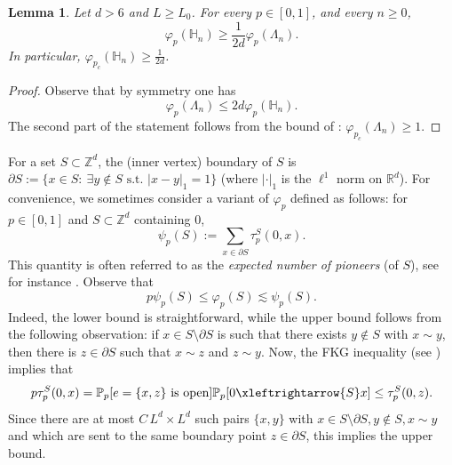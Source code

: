 \documentclass[11pt,a4paper]{article}
\numberwithin{equation}{section}
\theoremstyle{plain}
\newtheorem{Lem}[Thm]{Lemma}
\theoremstyle{definition}
\newcommand{\connect}{\xleftrightarrow}
\newcommand{\1}{\mathbf 1}
\def \p {{\partial}}
\begin{document}
\begin{Lem}\label{lem:lower bound phi} Let $d>6$ and $L\geq L_0$. For every $p\in [0,1]$, and every $n\geq 0$,
\begin{equation}
	\varphi_{p}(\mathbb H_n)\geq \frac{1}{2d}\varphi_{p}(\Lambda_n).
\end{equation}
In particular, $\varphi_{p_c}(\mathbb H_n)\geq \tfrac{1}{2d}$.
\end{Lem}
\begin{proof} Observe that by symmetry one has
\begin{equation}
	\varphi_{p}(\Lambda_n)\leq 2d \varphi_{p}(\mathbb H_n).
\end{equation}
The second part of the statement follows from the bound of \cite{DuminilTassionNewProofSharpness2016}: $\varphi_{p_c}(\Lambda_n)\geq 1$.
\end{proof}
For a set $S\subset \mathbb Z^d$, the (inner vertex) boundary of $S$ is $\partial S:=\{x\in S:~\exists y\notin S \text{ s.t. } \vert x-y\vert_1=1\}$ (where $|\cdot|_1$ is the $\ell^1$ norm on $\mathbb R^d$).
For convenience, we sometimes consider a variant of $\varphi_{p}$ defined as follows: for $p\in [0,1]$ and $S\subset \mathbb Z^d$ containing $0$,
	\begin{equation}
		\psi_{p}(S):=\sum_{x\in \partial S} \tau_{p}^{S}(0,x).
	\end{equation}
This quantity is often referred to as the \emph{expected number of pioneers} (of $S$), see for instance \cite{HutchcroftMichtaSladePercolationTorusPlateau2023}. Observe that
\begin{equation}\label{eq:comparison psi phi}
	p\psi_{p}(S)\leq \varphi_{p}(S) \lesssim \psi_{p}(S).
\end{equation}
Indeed, the lower bound is straightforward, while the upper bound follows from the following observation: 
if $x\in S \setminus \p S$ is such that there exists $y\notin S$ with $x\sim y$, then there is $z \in \p S$ such that $x\sim z$ and $z\sim y$. Now, the FKG inequality (see \cite{GrimmettPercolation1999}) implies that
\begin{equation}\label{eq:finite energy arg}
	p\tau_{p}^{S}(0,x)=\mathbb P_p[e=\{x,z\}\textup{ is open}]\mathbb P_p[0\connect{S}x]\leq \tau_{p}^{S}(0,z).
\end{equation}
Since there are at most $C\,  L^d \times L^d$ such pairs $ \{x,y\}$ with $x\in S\setminus \p S, y\notin S, x\sim y$ and which are  sent to the same boundary point $z\in \p S$, this implies the upper bound. 
\end{document}
